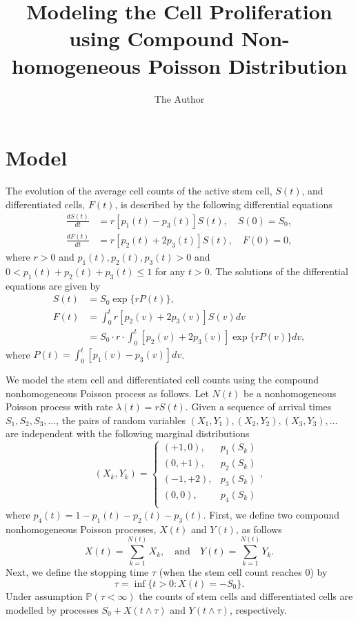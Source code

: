 \documentclass[10pt]{article}
\title{Modeling the Cell Proliferation using Compound Non-homogeneous Poisson Distribution}
\author{The Author}
\date{} %
\newcommand{\PP}{\mathbb{P}}
\begin{document}
\maketitle
\section{Model}
The evolution of the average cell counts of the active stem cell, $S(t)$, and differentiated cells, $F(t)$, is
described by the following differential equations
\begin{equation*}
\begin{split}
\frac{dS(t)}{dt} &= r[p_1(t) - p_3(t)] S(t), \quad S(0)=S_0, \\
\frac{dF(t)}{dt} &= r[p_2(t) + 2p_3(t)] S(t), \quad F(0)=0,
\end{split}
\end{equation*}
where $r>0$ and  $p_1(t), p_2(t), p_3(t)>0$ and  $0<p_1(t)+p_2(t)+p_3(t)\leq 1$ for any $t>0$. The solutions
of the differential equations are given by
\begin{equation*}
\begin{split}
S(t) & = S_0 \exp \Big\{ r P(t) \Big\}, \\
F(t) & = \int_0^t r  [p_2(v) + 2p_3(v)] S(v) dv\\
&= S_0 \cdot r \cdot \int_0^t [p_2(v) + 2p_3(v)] \exp \Big\{r P(v) \Big\} dv,
\end{split}
\end{equation*}
where $P(t) = \int_0^t [p_1(v) - p_3(v)] dv$.

We model the stem cell and differentiated cell counts using the compound nonhomogeneous Poisson process as follows.
Let $N(t)$ be a nonhomogeneous Poisson process with rate $\lambda(t) = r S(t)$. Given a sequence of arrival times $S_1, S_2, S_3,\dots$, the pairs of random variables
$(X_1,Y_1), (X_2,Y_2), (X_3,Y_3), \dots$ are independent with the following marginal distributions
\begin{equation*}
(X_k, Y_k) = \begin{cases}
(+1,0),  & p_1(S_k) \\
(0,+1),  & p_2(S_k) \\
(-1,+2), & p_3(S_k) \\
(0,0),   & p_4(S_k)\\
\end{cases},
\end{equation*}
where $p_4(t)=1-p_1(t)-p_2(t)-p_3(t).$
First, we define two compound nonhomogeneous Poisson processes, $X(t)$ and $Y(t)$, as follows
\begin{equation*}
X(t) = \sum_{k=1}^{N(t)} X_{k}, \quad \text{and} \quad
Y(t) = \sum_{k=1}^{N(t)} Y_{k}.
\end{equation*}
Next, we define the stopping time $\tau$ (when the stem cell count reaches 0) by
\begin{equation*}
\tau=\inf\{t>0:X(t)=-S_0\}.
\end{equation*}
Under assumption $\PP(\tau<\infty)$ the counts of stem cells and differentiated cells are modelled by processes $S_0+X(t\wedge\tau)$ and $Y(t\wedge\tau)$, respectively.
\end{document}
